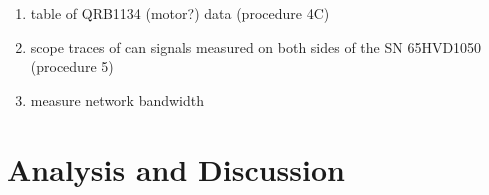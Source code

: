\documentclass[12pt]{article}
\newcommand{\todo}[1]{{\color{red}{\LARGE TODO} #1}}
\begin{document}
\begin{enumerate}
\item \todo{table of QRB1134 (motor?) data (procedure 4C)}
\item \todo{scope traces of can signals measured on both sides of the SN
  65HVD1050 (procedure 5)}
\item \todo{measure network bandwidth}
\end{enumerate}


\section{Analysis and Discussion}
\end{document}
